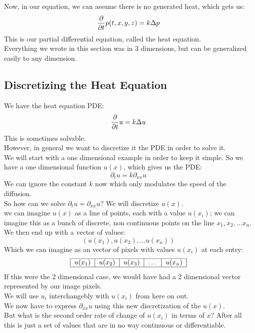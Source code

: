 \documentclass[12pt]{article}
\begin{document}
Now, in our equation,
we can assume there is no generated
heat, which gets us:
\[ \dfrac{\partial }{\partial t} p(t, x, y, z) = k \Delta p \]
This is our partial differential equation,
called the heat equation. \\

Everything we wrote in this section was
in $3$ dimensions, but can be generalized
easily to any dimension. \\ 

\newpage

\subsection*{Discretizing the Heat Equation}

We have the heat equation PDE:
\[ \dfrac{\partial }{\partial t} u = k \Delta u \]
This is sometimes solvable. \\

However, in general we want to discretize it
the PDE in order to solve it. \\

We will start with a one dimensional example
in order to keep it simple.
So we have a one dimensional function $u(x)$,
which gives us the PDE:
\[ \partial_t u = k \partial_{xx} u\]
We can ignore the constant $k$
now which only modulates the speed of 
the diffusion. \\

So how can we solve $\partial_t u =\partial_{xx} u$?
We will discretize $u(x)$. \\
we can imagine $u(x)$ as a line of points,
each with a value $u(x_i)$;
we can imagine this as a bunch of discrete,
non continuous points
on the line $x_1, x_2, \dots x_n$. \\
We then end up with a vector of values:
\[ (u(x_1), u(x_2), \dots u(x_n)) \]
Which we can imagine as an vector of pixels
with values $u(x_i)$ at each entry:
\[
    \begin{tabular}{|c|c|c|c|c|}
    \hline
    $u(x_1)$ & $u(x_2)$ & $u(x_3)$ & 
    $\dots$ & $u(x_n)$ \\
    \hline
    \end{tabular}
\]
If this were the 2 dimensional case, 
we would have had a 2 dimensional vector
represented by our image pixels. \\

We will use $u_i$ interchangebly
with $u(x_i)$ from here on out. \\

We now have to express $\partial_{xx} u$
using this new discretization of the $u(x)$. \\
But what is the second order rate of change of $u(x_i)$
in terms of $x$? After all this is just a set of
values that are in no way continuous or differentiable. \\
\end{document}
